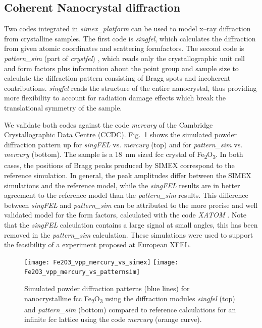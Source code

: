 \documentclass[10pt]{scrartcl}
\begin{document}
\subsection{Coherent Nanocrystal diffraction\label{sec:coherent_nanocrystal_diffraction}}
Two codes integrated in \textit{simex\_platform} can be used to model x--ray
diffraction from crystalline samples. The first code is \textit{singfel},
which calculates the diffraction from given atomic coordinates and scattering
formfactors. The second code is \textit{pattern\_sim} (part of
\textit{crystfel}) \cite{White2012}, which
reads only the crystallographic unit cell and form factors plus information
about the point group and sample size to calculate the diffraction
pattern consisting of Bragg spots and incoherent contributions.
\textit{singfel} reads the structure of the entire nanocrystal, thus providing
more flexibility to account for radiation damage effects which break the
translational symmetry of the sample.

We validate both codes against the code \textit{mercury} \cite{Macrae2008} of the
Cambridge Crystallographic Data Centre (CCDC). Fig.~\ref{fig:Fe2O3_vpp_model_vs_model} shows the simulated
powder diffraction pattern up for \textit{singFEL} vs. \textit{mercury} (top)
and for \textit{pattern\_sim} vs. \textit{mercury} (bottom). The sample is a
\SI{18}{\nano\metre} sized fcc crystal of
Fe\textsubscript{2}O\textsubscript{3}. In both cases, the
positions of Bragg peaks produced by SIMEX correspond to the reference
simulation. In general, the peak amplitudes differ between the SIMEX simulations and the
reference model, while the \textit{singFEL} results are in better agreement to the
reference model than the \textit{pattern\_sim} results. This difference between
\textit{singFEL} and \textit{pattern\_sim} can be attributed to the more
precise and well validated model for the form factors, calculated with the code \textit{XATOM}
\cite{Son2011}. Note that the \textit{singFEL} calculation contains a
large signal at small angles, this has been removed in the \textit{pattern\_sim}
calculation. These simulations were used to support the feasibility of a
experiment proposed at European XFEL.

\begin{figure}[ht]
  \begin{center}
      \texttt{[image: Fe2O3\_vpp\_mercury\_vs\_simex]}
      \texttt{[image: Fe2O3\_vpp\_mercury\_vs\_patternsim]}
  \caption{Simulated powder diffraction patterns (blue lines) for nanocrystalline fcc Fe\textsubscript{2}O\textsubscript{3}
  using the diffraction modules \textit{singfel} (top) and \textit{pattern\_sim}
  (bottom) compared to reference calculations for an infinite fcc lattice
    using the code \textit{mercury} (orange curve).}
    \label{fig:Fe2O3_vpp_model_vs_model}
  \end{center}
\end{figure}
\end{document}
